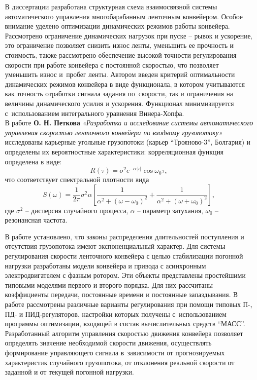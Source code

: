 В диссертации разработана структурная схема взаимосвязной системы автоматического управления многобарабанным ленточным конвейером. Особое внимание уделено оптимизации динамических режимов работы конвейера. Рассмотрено ограничение динамических нагрузок при пуске -- рывок и ускорение, это ограничение позволяет снизить износ ленты, уменьшить ее прочность и стоимость, также рассмотрено обеспечение высокой точности регулирования скорости при работе конвейера с постоянной скоростью, что позволяет уменьшить износ и~пробег ленты. Автором введен критерий оптимальности динамических режимов конвейера в виде функционала, в котором учитываются как точность отработки сигнала задания по~скорости, так и ограничения на величины динамического усилия и ускорения. Функционал минимизируется с~использованием интегрального уравнения Винера-Хопфа.\\

В работе \textbf{О. Н. Петкова} \textit{«Разработка и исследование системы автоматического управления скоростью ленточного конвейера по входному грузопотоку»} \cite{opetkov} исследованы карьерные угольные грузопотоки (карьер “Трояново-3”, Болгария) и определены их вероятностные характеристики: корреляционная функция определена в виде:
$$
R(\tau) = \sigma^2 e^{-\alpha|\tau|}\cos\omega_0 \tau,
$$
что соответствует спектральной плотности вида 
$$
S(\omega) = \frac{1}{2\pi} \sigma^2 \alpha \left[ \frac{1}{\alpha^2 + (\omega - \omega_0)^2} +\frac{1}{\alpha^2 + (\omega + \omega_0)^2} \right],
$$
где $ \sigma^2 $ -- дисперсия случайного процесса, $ \alpha $ -- параметр затухания, $ \omega_0 $ -- резонансная частота.

В работе установлено, что законы распределения длительностей поступления и отсутствия грузопотока имеют экспоненциальный характер. Для системы регулирования скорости ленточного конвейера с целью стабилизации погонной нагрузки разработаны модели конвейера и привода с асинхронным электродвигателем с фазным ротором. Эти объекты представлены простейшими типовыми моделями первого и второго порядка. Для них рассчитаны коэффициенты передачи, постоянные времени и постоянные запаздывания. В работе рассмотрены различные варианты регулирования при помощи типовых П-, ПД- и ПИД-регуляторов, настройки которых получены с~использованием программы оптимизации, входящей в состав вычислительных средств “МАСС”. Разработанный алгоритм управления скоростью движения конвейера позволяет определять значение необходимой скорости движения, осуществлять формирование управляющего сигнала в~зависимости от прогнозируемых характеристик случайного грузопотока, от отклонения реальной скорости от заданной и от текущей погонной нагрузки.

